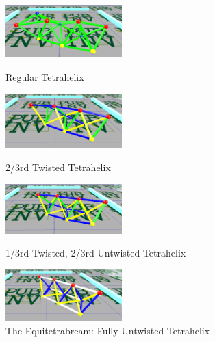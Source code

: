 \documentclass[11pt]{article}
\begin{document}
\begin{figure}[H] %
  \centering
     \includegraphics[width=0.4\textwidth]{figures/Tetrahelix0.png}
     \caption{Regular Tetrahelix}
     \includegraphics[width=0.4\textwidth]{figures/Tetrahelix1.png}
     \caption{2/3rd Twisted Tetrahelix}
     \includegraphics[width=0.4\textwidth]{figures/Tetrahelix2.png}
     \caption{1/3rd Twisted, 2/3rd Untwisted Tetrahelix}
     \includegraphics[width=0.4\textwidth]{figures/Tetrahelix3.png}
     \caption{The Equitetrabream: Fully Untwisted Tetrahelix}
\end{figure}
\end{document}
